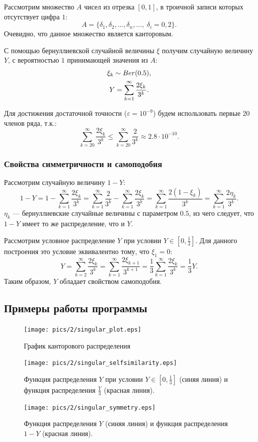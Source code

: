 \documentclass[11pt]{article}
\begin{document}
Рассмотрим множество $A$ чисел из отрезка $[0, 1]$, в троичной записи которых отсутствует цифра $1$:
$$
A = \{ \delta_1, \delta_2, \ldots, \delta_n, \ldots, \; \delta_i = 0, 2 \}.
$$
Очевидно, что данное множество является канторовым.

С помощью бернуллиевской случайной величины $\xi$ получим случайную величину $Y$, с вероятностью $1$ принимающей значения из $A$:
\begin{gather}
\xi_k \sim Ber(0.5), \notag \\
Y = \sum\limits_{k=1}^{\infty} \frac{2\xi_k}{3^k}. \notag
\end{gather}

Для достижения достаточной точности ($\varepsilon = 10^{-9}$) будем использовать первые $20$ членов ряда, т.к.:
$$
\sum\limits_{k=20}^{\infty} \frac{2\xi_k}{3^k} \leqslant \sum\limits_{k=20}^{\infty} \frac{2}{3^k} \approx 2.8 \cdot 10^{-10}.
$$
\subsubsection{Свойства симметричности и самоподобия}
Рассмотрим случайную величину $1-Y$:
$$
1 - Y = 1 - \sum\limits_{k=1}^{\infty} \frac{2\xi_k}{3^k} = \sum\limits_{k=1}^{\infty} \frac{2}{3^k} - \sum\limits_{k=1}^{\infty} \frac{2\xi_k}{3^k} = \sum\limits_{k=1}^{\infty} \frac{2(1 - \xi_k)}{3^k} = \sum\limits_{k=1}^{\infty} \frac{2\eta_k}{3^k}.
$$
$\eta_k$ --- бернуллиевские случайные величины с параметром $0.5$, из чего следует, что $1-Y$ имеет то же распределение, что и $Y$.

Рассмотрим условное распределение $Y$ при условии $Y \in [0, \tfrac{1}{3}]$. Для данного построения это условие эквивалентно тому, что $\xi_1 = 0$:
$$
Y = \sum\limits_{k=2}^{\infty} \frac{2\xi_k}{3^k} = \sum\limits_{k=1}^{\infty} \frac{2\xi_{k+1}}{3^{k+1}}=\frac{1}{3} \sum\limits_{k=1}^{\infty} \frac{2\xi_k}{3^k} = \frac{1}{3} Y.
$$
Таким образом, $Y$ обладает свойством самоподобия.
\subsection{Примеры работы программы}
\begin{figure}[h!]
	\centering
	\texttt{[image: pics/2/singular\_plot.eps]}
	\caption{График канторового распределения}
\end{figure}
\begin{figure}[h!]
	\centering
	\texttt{[image: pics/2/singular\_selfsimilarity.eps]}
	\caption{Функция распределения $Y$ при условии $Y \in [0, \tfrac{1}{3}]$ (синяя линия) и функция распределения $\tfrac{Y}{3}$ (красная линия).}
\end{figure}
\begin{figure}[h!]
	\centering
	\texttt{[image: pics/2/singular\_symmetry.eps]}
	\caption{Функция распределения $Y$ (синяя линия) и функция распределения $1-Y$ (красная линия).}
\end{figure}
\pagebreak
\end{document}
